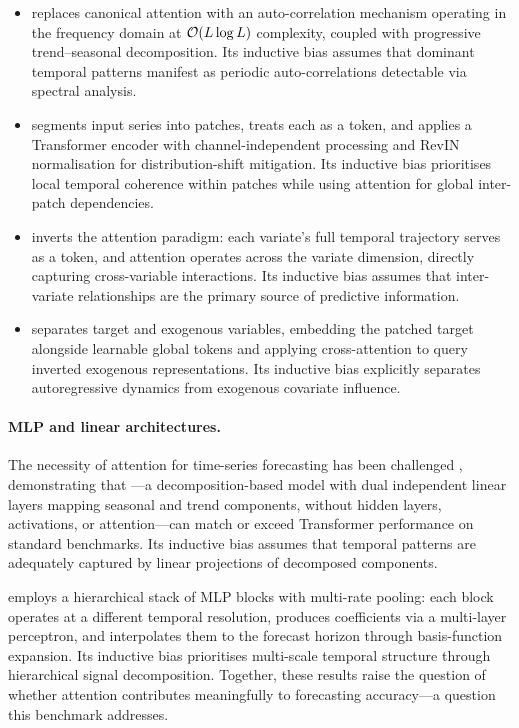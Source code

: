 \begin{itemize}[nosep]
  \item \autoformer \citep{Wu2021} replaces canonical attention with an auto-correlation mechanism operating in the frequency domain at $\mathcal{O}(L \log L)$ complexity, coupled with progressive trend--seasonal decomposition.  Its inductive bias assumes that dominant temporal patterns manifest as periodic auto-correlations detectable via spectral analysis.

  \item \patchtst \citep{Nie2023} segments input series into patches, treats each as a token, and applies a Transformer encoder with channel-independent processing and RevIN normalisation \citep{Kim2022} for distribution-shift mitigation.  Its inductive bias prioritises local temporal coherence within patches while using attention for global inter-patch dependencies.

  \item \itransformer \citep{Liu2024itransformer} inverts the attention paradigm: each variate's full temporal trajectory serves as a token, and attention operates across the variate dimension, directly capturing cross-variable interactions.  Its inductive bias assumes that inter-variate relationships are the primary source of predictive information.

  \item \timexer \citep{Wang2024timexer} separates target and exogenous variables, embedding the patched target alongside learnable global tokens and applying cross-attention to query inverted exogenous representations.  Its inductive bias explicitly separates autoregressive dynamics from exogenous covariate influence.
\end{itemize}

\paragraph{MLP and linear architectures.}
The necessity of attention for time-series forecasting has been challenged \citep{Zeng2023}, demonstrating that \dlinear---a decomposition-based model with dual independent linear layers mapping seasonal and trend components, without hidden layers, activations, or attention---can match or exceed Transformer performance on standard benchmarks.  Its inductive bias assumes that temporal patterns are adequately captured by linear projections of decomposed components.

\nhits \citep{Challu2023} employs a hierarchical stack of MLP blocks with multi-rate pooling: each block operates at a different temporal resolution, produces coefficients via a multi-layer perceptron, and interpolates them to the forecast horizon through basis-function expansion.  Its inductive bias prioritises multi-scale temporal structure through hierarchical signal decomposition.  Together, these results raise the question of whether attention contributes meaningfully to forecasting accuracy---a question this benchmark addresses.

